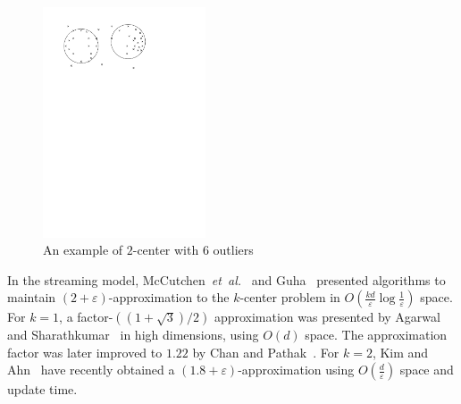 \documentclass[envcountsame]{cls/cccg15}
\renewcommand{\O}{\ensuremath{{O}}}
\newcommand{\eps}{\varepsilon}
\newcommand{\etal}{{\em et~al.\/}}
\begin{document}
\begin{figure}[t]
	\centering
	\includegraphics[width=13em]{figs/definition}
	\caption{An example of $2$-center with 6 outliers}
	\label{fig:definition}
	\vspace{-.5em}
\end{figure}

In the streaming model, McCutchen~\etal~\cite{mccutchen2008streaming} 
and Guha~\cite{guha2009tight} presented algorithms to maintain $(2+\eps)$-approximation 
to the $k$-center problem in %
$\O(\frac{kd}{\eps} \log \frac{1}{\eps})$ space.
For $k=1$, %
a factor-$((1+\sqrt{3})/{2})$ approximation 
was presented by Agarwal and Sharathkumar~\cite{agarwal2010streaming} 
in high dimensions, using $O(d)$ space. 
The approximation factor was later improved 
to $1.22$ by Chan and Pathak~\cite{chan2014streaming}.
For $k=2$, Kim and Ahn~\cite{kim2014improved} 
have recently obtained a $(1.8+\eps)$-approximation  
using $\O(\frac{d}{\eps})$ space and update time.
\end{document}

